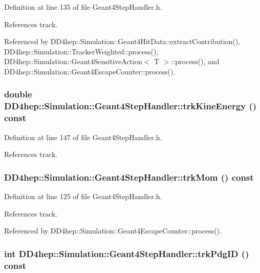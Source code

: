 Definition at line 135 of file Geant4StepHandler.h.

References track.

Referenced by DD4hep::Simulation::Geant4HitData::extractContribution(), DD4hep::Simulation::TrackerWeighted::process(), DD4hep::Simulation::Geant4SensitiveAction$<$ T $>$::process(), and DD4hep::Simulation::Geant4EscapeCounter::process().\hypertarget{class_d_d4hep_1_1_simulation_1_1_geant4_step_handler_afd5bdb880e61a61270f3fb84d606a5d9}{
\subsubsection[{trkKineEnergy}]{\setlength{\rightskip}{0pt plus 5cm}double DD4hep::Simulation::Geant4StepHandler::trkKineEnergy () const}}
\label{class_d_d4hep_1_1_simulation_1_1_geant4_step_handler_afd5bdb880e61a61270f3fb84d606a5d9}


Definition at line 147 of file Geant4StepHandler.h.

References track.\hypertarget{class_d_d4hep_1_1_simulation_1_1_geant4_step_handler_ae7c77f7a22ebb78200c03e5efaa6e18c}{
\subsubsection[{trkMom}]{ DD4hep::Simulation::Geant4StepHandler::trkMom () const}}
\label{class_d_d4hep_1_1_simulation_1_1_geant4_step_handler_ae7c77f7a22ebb78200c03e5efaa6e18c}


Definition at line 125 of file Geant4StepHandler.h.

References track.

Referenced by DD4hep::Simulation::Geant4EscapeCounter::process().\hypertarget{class_d_d4hep_1_1_simulation_1_1_geant4_step_handler_ac3bbde8d1c91b9375c00cfc3b65fac23}{
\subsubsection[{trkPdgID}]{\setlength{\rightskip}{0pt plus 5cm}int DD4hep::Simulation::Geant4StepHandler::trkPdgID () const}}
\label{class_d_d4hep_1_1_simulation_1_1_geant4_step_handler_ac3bbde8d1c91b9375c00cfc3b65fac23}


